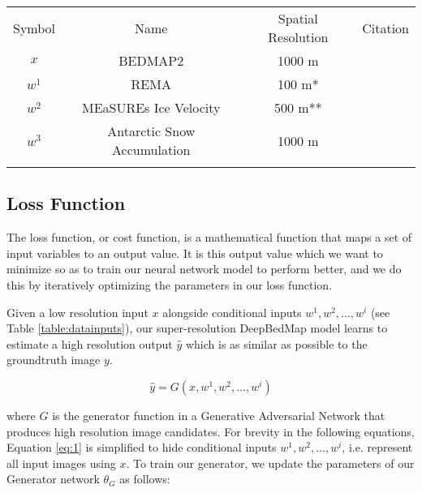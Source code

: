 \documentclass[tc, manuscript]{copernicus}
\begin{document}
\begin{table*}[ht]
\caption{Remote Sensing dataset inputs into the DeepBedMap neural network model.}
\label{table:datainputs}
\begin{tabular}{cccc}
\tophline
Symbol & Name & Spatial Resolution & Citation \\
\middlehline
$x$ & BEDMAP2 & 1000 m & \cite{FretwellBedmap2improvedice2013} \\
$w^1$ & REMA & 100 m* & \cite{HowatReferenceElevationModel2019} \\
$w^2$ & MEaSUREs Ice Velocity & 500 m** & \cite{MouginotContinentwideinterferometric2019} \\
$w^3$ & Antarctic Snow Accumulation & 1000 m & \cite{ArthernAntarcticsnowaccumulation2006} \\
\bottomhline
\end{tabular}
\end{table*}

\subsection{Loss Function}

The loss function, or cost function, is a mathematical function that maps a set of input variables to an output value.
It is this output value which we want to minimize so as to train our neural network model to perform better, and we do this by iteratively optimizing the parameters in our loss function.

Given a low resolution input $x$ alongside conditional inputs $w^1, w^2, \dots, w^i$ (see Table \ref{table:datainputs}), our super-resolution DeepBedMap model learns to estimate a high resolution output $\hat{y}$ which is as similar as possible to the groundtruth image $y$.

\begin{equation}\label{eq:1}
  \hat{y} = G(x, w^1, w^2, \dots, w^i)
\end{equation}

where $G$ is the generator function in a Generative Adversarial Network that produces high resolution image candidates.
For brevity in the following equations, Equation \eqref{eq:1} is simplified to hide conditional inputs $w^1, w^2, \dots, w^i$, i.e. represent all input images using $x$.
To train our generator, we update the parameters of our Generator network $\theta_G$ as follows:
\end{document}
